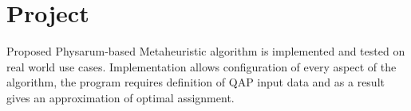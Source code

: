 \chapter{Project}
\label{chapter:project}

Proposed Physarum-based Metaheuristic algorithm is implemented and tested on real world use cases. Implementation allows configuration of every aspect of the algorithm, the program requires definition of QAP input data and as a result gives an approximation of optimal assignment.





